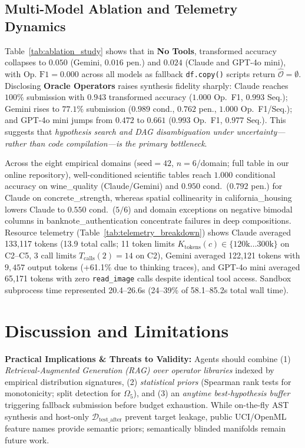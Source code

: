 \documentclass[sigconf]{acmart}
\begin{document}
\subsection{Multi-Model Ablation and Telemetry Dynamics}
Table~\ref{tab:ablation_study} shows that in \textbf{No Tools}, transformed accuracy collapses to $0.050$ (Gemini, $0.016$ pen.) and $0.024$ (Claude and GPT-4o mini), with $\text{Op.\ F1}=0.000$ across all models as fallback \texttt{df.copy()} scripts return $\widehat{\mathcal{O}}=\emptyset$. Disclosing \textbf{Oracle Operators} raises synthesis fidelity sharply: Claude reaches $100\%$ submission with $0.943$ transformed accuracy ($1.000$ Op.\ F1, $0.993$ Seq.); Gemini rises to $77.1\%$ submission ($0.989$ cond., $0.762$ pen., $1.000$ Op.\ F1/Seq.); and GPT-4o mini jumps from $0.472$ to $0.661$ ($0.993$ Op.\ F1, $0.977$ Seq.). This suggests that \emph{hypothesis search and DAG disambiguation under uncertainty—rather than code compilation—is the primary bottleneck}.

Across the eight empirical domains ($\text{seed}=42$, $n=6$/domain; full table in our online repository), well-conditioned scientific tables reach $1.000$ conditional accuracy on \textsf{wine\_quality} (Claude/Gemini) and $0.950$ cond.\ ($0.792$ pen.) for Claude on \textsf{concrete\_strength}, whereas spatial collinearity in \textsf{california\_housing} lowers Claude to $0.550$ cond.\ ($5/6$) and domain exceptions on negative bimodal columns in \textsf{banknote\_authentication} concentrate failures in deep compositions. Resource telemetry (Table~\ref{tab:telemetry_breakdown}) shows Claude averaged 133,117 tokens (13.9 total calls; 11 token limits $K_{\text{tokens}}(c)\in\{120\text{k}\dots 300\text{k}\}$ on C2--C5, 3 call limits $T_{\text{calls}}(2)=14$ on C2), Gemini averaged 122,121 tokens with $9,457$ output tokens (+61.1\% due to thinking traces), and GPT-4o mini averaged 65,171 tokens with zero \texttt{read\_image} calls despite identical tool access. Sandbox subprocess time represented 20.4--26.6s (24--39\% of 58.1--85.2s total wall time).

\section{Discussion and Limitations}
\noindent\textbf{Practical Implications \& Threats to Validity:} Agents should combine (1) \emph{Retrieval-Augmented Generation (RAG) over operator libraries} indexed by empirical distribution signatures, (2) \emph{statistical priors} (Spearman rank tests for monotonicity; split detection for $\Omega_5$), and (3) an \emph{anytime best-hypothesis buffer} triggering fallback submission before budget exhaustion. While on-the-fly AST synthesis and host-only $\mathcal{D}_{\text{test\_after}}$ prevent target leakage, public UCI/OpenML feature names provide semantic priors; semantically blinded manifolds remain future work.
\end{document}

